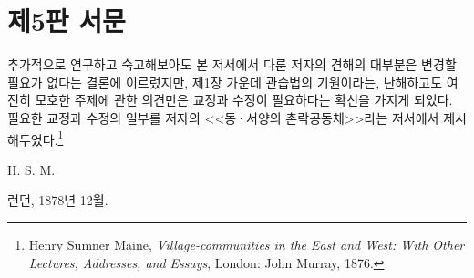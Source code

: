 \chapter{제5판 서문}

추가적으로 연구하고 숙고해보아도
본 저서에서 다룬 저자의 견해의 대부분은
변경할 필요가 없다는 결론에 이르렀지만,
제1장 가운데
관습법의 기원이라는, 난해하고도 여전히 모호한 주제에 관한 의견만은
교정과 수정이 필요하다는 확신을 가지게 되었다.
필요한 교정과 수정의 일부를
저자의
<<동^^b7서양의 촌락공동체>>라는
저서에서 제시해두었다.\footnote{%
  \latinmarks
  Henry Sumner Maine,
  \textit{Village-communities in the East and West: With Other Lectures,
  Addresses, and Essays},
  London: John Murray, 1876. }

\begin{flushright}
H. S. M.
\end{flushright}

\begin{footnotesize}
런던, 1878년 12월.
\end{footnotesize}

